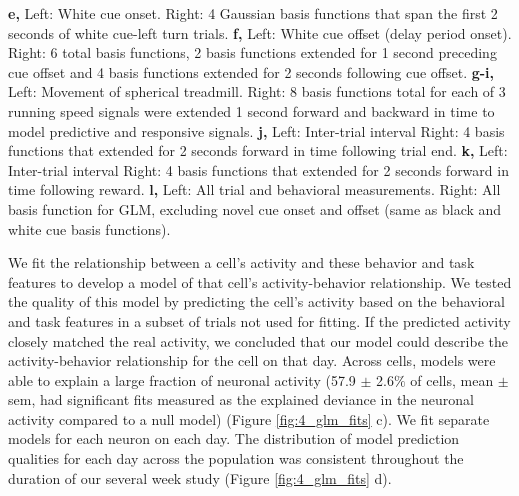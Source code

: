 \begin{FPfigure}
{%
\textbf{e,} Left: White cue onset. Right: 4 Gaussian basis functions that span the first 2 seconds of white cue-left turn trials. 
%
\textbf{f,} Left: White cue offset (delay period onset). Right: 6 total basis functions, 2 basis functions extended for 1 second preceding cue offset and 4 basis functions extended for 2 seconds following cue offset. 
%
\textbf{g-i,} Left: Movement of spherical treadmill. Right: 8 basis functions total for each of 3 running speed signals were extended 1 second forward and backward in time to model predictive and responsive signals.
%
\textbf{j,} Left: Inter-trial interval Right: 4 basis functions that extended for 2 seconds forward in time following trial end. 
%
\textbf{k,} Left: Inter-trial interval Right: 4 basis functions that extended for 2 seconds forward in time following reward.
%
\textbf{l,} Left: All trial and behavioral measurements. Right: All basis function for GLM, excluding novel cue onset and offset (same as black and white cue basis functions).
\label{fig:4_filters}}
\end{FPfigure}
\clearpage

\bigskip

We fit the relationship between a cell's activity and these behavior and task features to develop a model of that cell's activity-behavior relationship. We tested the quality of this model by predicting the cell's activity based on the behavioral and task features in a subset of trials not used for fitting. If the predicted activity closely matched the real activity, we concluded that our model could describe the activity-behavior relationship for the cell on that day. Across cells, models were able to explain a large fraction of neuronal activity (57.9 $\pm$ 2.6$\%$ of cells, mean $\pm$ sem, had significant fits measured as the explained deviance in the neuronal activity compared to a null model) (Figure \ref{fig:4_glm_fits} c). We fit separate models for each neuron on each day. The distribution of model prediction qualities for each day across the population was consistent throughout the duration of our several week study (Figure \ref{fig:4_glm_fits} d).


